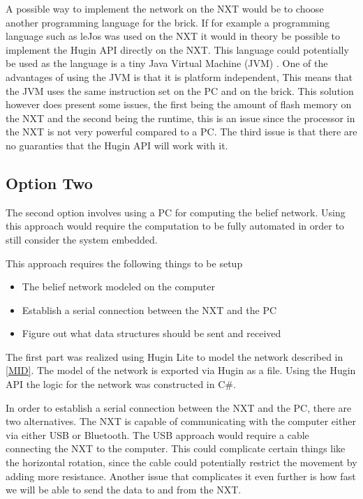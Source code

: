 A possible way to implement the network on the NXT would be to choose another
programming language for the brick. If for example a programming language such
as leJos was used on the NXT it would in theory be possible to implement the
Hugin API directly on the NXT. This language could potentially be used as the
language is a tiny Java Virtual Machine (JVM) \cite{LeJos}. One of the
advantages of using the JVM is that it is platform independent, This means
that the JVM uses the same instruction set on the PC and on the brick. This
solution however does present some issues, the first being the amount of flash
memory on the NXT and the second being the runtime, this is an issue since the
processor in the NXT is not very powerful compared to a PC.
The third issue is that there are no guaranties that the Hugin API will work with it.

\subsection{Option Two}
The second option involves using a PC for computing the
belief network. Using this approach would require the computation to be fully
automated in order to still consider the system embedded.\nl

This approach requires the following things to be setup
\begin{itemize}
\item The belief network modeled on the computer
\item Establish a serial connection between the NXT and the PC
\item Figure out what data structures should be sent and received
\end{itemize}

The first part was realized using Hugin Lite to model the network described
in \autoref{MID}. The model of the network is exported via Hugin as a file.
Using the Hugin API the logic for the network was constructed in C\#.\nl

In order to establish a serial connection between the NXT and the PC, there are
two alternatives. The NXT is capable of communicating with the computer either
via either USB or Bluetooth. The USB approach would require a cable connecting
the NXT to the computer.
This could complicate certain things like the horizontal rotation, since the
cable could potentially restrict the movement by adding more resistance.
Another issue that complicates it even further is how fast we will be able to
send the data to and from the NXT.\nl

